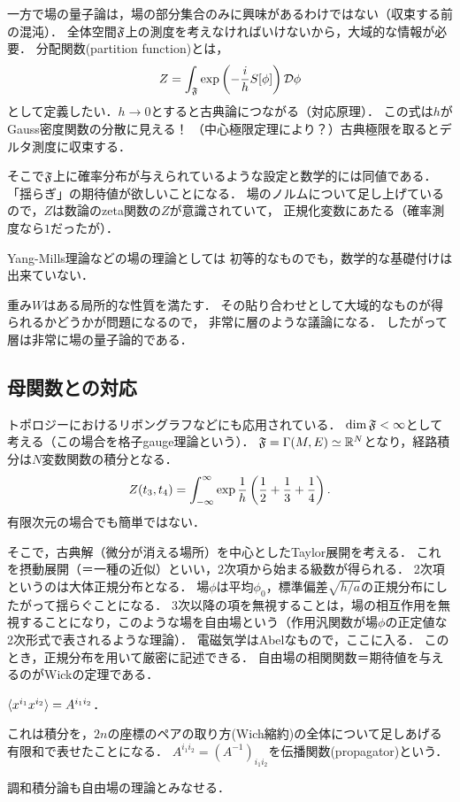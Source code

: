 \documentclass[uplatex,dvipdfmx]{jsreport}
\begin{document}
一方で場の量子論は，場の部分集合のみに興味があるわけではない（収束する前の混沌）．
全体空間$\mathfrak{F}$上の測度を考えなければいけないから，大域的な情報が必要．
分配関数(partition function)とは，
\[Z=\int_{\mathfrak{F}}\exp\left(-\frac{i}{h}S[\phi]\right)\mathcal{D}\phi\]
として定義したい．$h\to0$とすると古典論につながる（対応原理）．
この式は$h$がGauss密度関数の分散に見える！
（中心極限定理により？）古典極限を取るとデルタ測度に収束する．

そこで$\mathfrak{F}$上に確率分布が与えられているような設定と数学的には同値である．
「揺らぎ」の期待値が欲しいことになる．
場のノルムについて足し上げているので，$Z$は数論のzeta関数の$Z$が意識されていて，
正規化変数にあたる（確率測度なら$1$だったが）．

Yang-Mills理論などの場の理論としては
初等的なものでも，数学的な基礎付けは出来ていない．

重み$W$はある局所的な性質を満たす．
その貼り合わせとして大域的なものが得られるかどうかが問題になるので，
非常に層のような議論になる．
したがって層は非常に場の量子論的である．

\subsection{母関数との対応}

トポロジーにおけるリボングラフなどにも応用されている．
$\dim\mathfrak{F}<\infty$として考える（この場合を格子gauge理論という）．
$\mathfrak{F}=\Gamma(M,E)\simeq\mathbb{R}^N$となり，経路積分は$N$変数関数の積分となる．
\[Z(t_3,t_4)=\int^\infty_{-\infty}\exp\frac{1}{h}\left(\frac{1}{2}+\frac{1}{3}+\frac{1}{4}\right).\]
有限次元の場合でも簡単ではない．

そこで，古典解（微分が消える場所）を中心としたTaylor展開を考える．
これを摂動展開（＝一種の近似）といい，2次項から始まる級数が得られる．
2次項というのは大体正規分布となる．
場$\phi$は平均$\phi_0$，標準偏差$\sqrt{h/a}$の正規分布にしたがって揺らぐことになる．
3次以降の項を無視することは，場の相互作用を無視することになり，このような場を自由場という（作用汎関数が場$\phi$の正定値な2次形式で表されるような理論）．
電磁気学はAbelなもので，ここに入る．
このとき，正規分布を用いて厳密に記述できる．
自由場の相関関数＝期待値を与えるのがWickの定理である．
\begin{theorem}[Wick]
    $\langle x^{i_1}x^{i_2}\rangle=A^{i_1i_2}$．
\end{theorem}
これは積分を，$2n$の座標のペアの取り方(Wich縮約)の全体について足しあげる有限和で表せたことになる．
$A^{i_1i_2}=(A^{-1})_{i_1i_2}$を伝播関数(propagator)という．

調和積分論も自由場の理論とみなせる．
\end{document}
